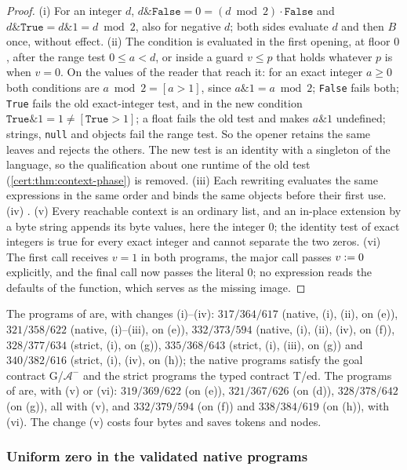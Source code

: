 \begin{proof}
(i) For an integer $d$, $d\mathbin{\&}\texttt{False}=0=(d\bmod 2)\cdot
\texttt{False}$ and $d\mathbin{\&}\texttt{True}=d\mathbin{\&}1=d\bmod 2$, also
for negative $d$; both sides evaluate $d$ and then $B$ once, without effect.
(ii) The condition is evaluated in the first opening, at floor $0$, after the
range test $0\le a<d$, or inside a guard $v\le p$ that holds whatever $p$ is
when $v=0$. On the values of the reader that reach it: for an exact integer
$a\ge 0$ both conditions are $a\bmod 2=[a>1]$, since $a\mathbin{\&}1=a\bmod 2$;
\texttt{False} fails both; \texttt{True} fails the old exact-integer test, and
in the new condition $\texttt{True}\mathbin{\&}1=1\neq[\texttt{True}>1]$; a
float fails the old test and makes $a\mathbin{\&}1$ undefined; strings,
\texttt{null} and objects fail the range test. So the opener retains the same
leaves and rejects the others. The new test is an identity with a singleton
of the language, so the qualification about one runtime of the old test
(\cref{cert:thm:context-phase}) is removed. (iii) Each rewriting evaluates the
same expressions in the same order and binds the same objects before their
first use. (iv) . (v) Every reachable context is
an ordinary list, and an in-place extension by a byte string appends its byte
values, here the integer $0$; the identity test of exact integers is true for
every exact integer and cannot separate the two zeros. (vi) The first call
receives $v=1$ in both programs, the major call passes $v\mathrel{:=} 0$ explicitly,
and the final call now passes the literal $0$; no expression reads the
defaults of the function, which serves as the missing image.
\end{proof}

The programs of  are, with changes (i)--(iv):
$317/364/617$ (native, (i), (ii), on (e)), $321/358/622$ (native, (i)--(iii), on
(e)), $332/373/594$ (native, (i), (ii), (iv), on (f)), $328/377/634$ (strict,
(i), on (g)), $335/368/643$ (strict, (i), (iii), on (g)) and $340/382/616$
(strict, (i), (iv), on (h)); the native programs satisfy the goal contract
G/$\mathcal A^{-}$ and the strict programs the typed contract T/ed. The
programs of  are, with (v) or (vi):
$319/369/622$ (on (e)), $321/367/626$ (on (d)), $328/378/642$ (on (g)), all with
(v), and $332/379/594$ (on (f)) and $338/384/619$ (on (h)), with (vi). The
change (v) costs four bytes and saves tokens and nodes.

\subsubsection*{Uniform zero in the validated native programs}

